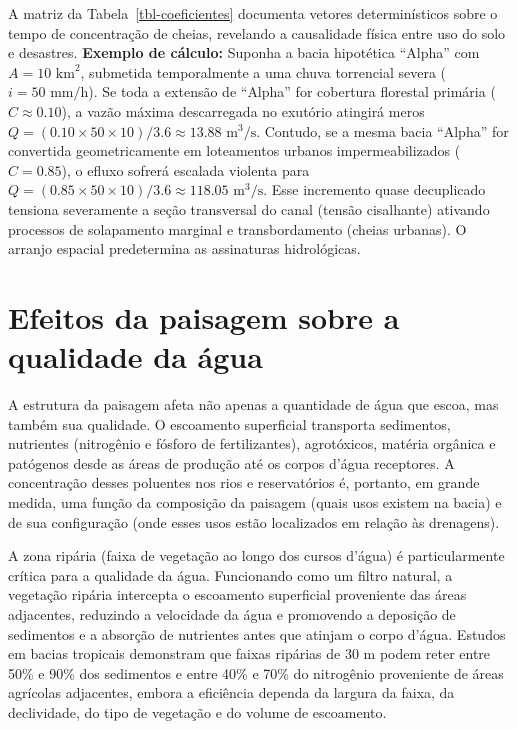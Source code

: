 \documentclass[
  portuguese,
  11pt,
  a4paper,
  open=any]{scrbook}
\begin{document}
A matriz da Tabela~\ref{tbl-coeficientes} documenta vetores
determinísticos sobre o tempo de concentração de cheias, revelando a
causalidade física entre uso do solo e desastres. \textbf{Exemplo de
cálculo:} Suponha a bacia hipotética ``Alpha'' com
\(A = 10 \text{ km}^2\), submetida temporalmente a uma chuva torrencial
severa (\(i = 50 \text{ mm/h}\)). Se toda a extensão de ``Alpha'' for
cobertura florestal primária (\(C \approx 0.10\)), a vazão máxima
descarregada no exutório atingirá meros
\(Q = (0.10 \times 50 \times 10) / 3.6 \approx 13.88 \text{ m}^3\text{/s}\).
Contudo, se a mesma bacia ``Alpha'' for convertida geometricamente em
loteamentos urbanos impermeabilizados (\(C = 0.85\)), o efluxo sofrerá
escalada violenta para
\(Q = (0.85 \times 50 \times 10) / 3.6 \approx 118.05 \text{ m}^3\text{/s}\).
Esse incremento quase decuplicado tensiona severamente a seção
transversal do canal (tensão cisalhante) ativando processos de
solapamento marginal e transbordamento (cheias urbanas). O arranjo
espacial predetermina as assinaturas hidrológicas.

\section{Efeitos da paisagem sobre a qualidade da
água}\label{efeitos-da-paisagem-sobre-a-qualidade-da-uxe1gua}

A estrutura da paisagem afeta não apenas a quantidade de água que escoa,
mas também sua qualidade. O escoamento superficial transporta
sedimentos, nutrientes (nitrogênio e fósforo de fertilizantes),
agrotóxicos, matéria orgânica e patógenos desde as áreas de produção até
os corpos d'água receptores. A concentração desses poluentes nos rios e
reservatórios é, portanto, em grande medida, uma função da composição da
paisagem (quais usos existem na bacia) e de sua configuração (onde esses
usos estão localizados em relação às drenagens).

A zona ripária (faixa de vegetação ao longo dos cursos d'água) é
particularmente crítica para a qualidade da água. Funcionando como um
filtro natural, a vegetação ripária intercepta o escoamento superficial
proveniente das áreas adjacentes, reduzindo a velocidade da água e
promovendo a deposição de sedimentos e a absorção de nutrientes antes
que atinjam o corpo d'água. Estudos em bacias tropicais demonstram que
faixas ripárias de 30 m podem reter entre 50\% e 90\% dos sedimentos e
entre 40\% e 70\% do nitrogênio proveniente de áreas agrícolas
adjacentes, embora a eficiência dependa da largura da faixa, da
declividade, do tipo de vegetação e do volume de escoamento.
\end{document}
